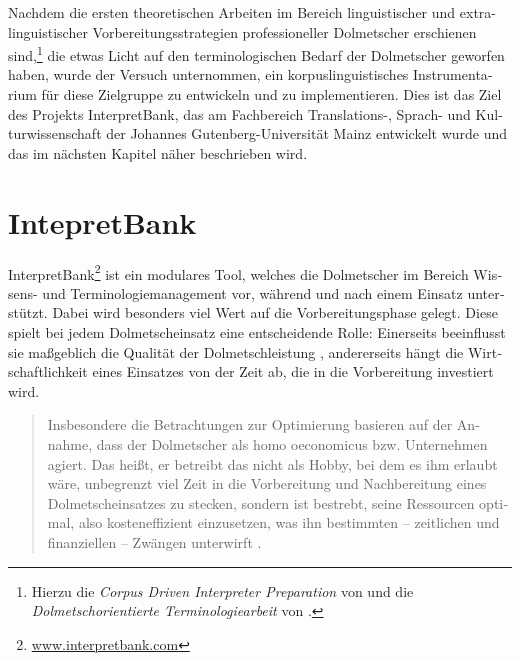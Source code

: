 \documentclass[output=paper]{LSP/langsci}
\begin{document}
\begin{otherlanguage}{ngerman}
Nachdem die ersten theoretischen Arbeiten im Bereich linguistischer und ex\-tra-lin\-guistischer Vorbereitungsstrategien professioneller Dolmetscher erschienen sind,\footnote{Hierzu die \textit{Corpus Driven Interpreter Preparation} von \citet{Fantinuoli2006} und die \textit{Dolmetschorientierte Terminologiearbeit} von \citet{Will2009}.} die etwas Licht auf den terminologischen Bedarf der Dolmetscher geworfen haben, wurde der Versuch unternommen, ein korpuslinguistisches Instrumentarium für diese Zielgruppe zu entwickeln und zu implementieren. Dies ist das Ziel des Projekts InterpretBank, das am Fachbereich Translations-, Sprach- und Kulturwissenschaft der Johannes Gutenberg-Universität Mainz entwickelt wurde und das im nächsten Kapitel näher beschrieben wird.

\section{IntepretBank}\label{sec:fantinuoli:6}

InterpretBank\footnote{\url{www.interpretbank.com}} ist ein modulares Tool, welches die Dolmetscher im Bereich Wis\-sens- und Terminologiemanagement vor, während und nach einem Einsatz unterstützt. Dabei wird besonders viel Wert auf die Vorbereitungsphase gelegt. Diese spielt bei jedem Dolmetscheinsatz eine entscheidende Rolle: Einerseits beeinflusst sie maßgeblich die Qualität der Dolmetschleistung \citep[777]{Kalina2005}, andererseits hängt die Wirtschaftlichkeit eines Einsatzes von der Zeit ab, die in die Vorbereitung investiert wird. 

\begin{quote}
Insbesondere die Betrachtungen zur Optimierung basieren auf der Annahme, dass der Dolmetscher als homo oeconomicus bzw. Unternehmen agiert. Das heißt, er betreibt das  nicht als Hobby, bei dem es ihm erlaubt wäre, unbegrenzt viel Zeit in die Vorbereitung und Nachbereitung eines Dolmetscheinsatzes zu stecken, sondern ist bestrebt, seine Ressourcen optimal, also kosteneffizient einzusetzen, was ihn bestimmten -- zeitlichen und finanziellen -- Zwängen unterwirft \citep[5 ff]{Rütten2007}.
\end{quote}


\end{otherlanguage}
\end{document}

